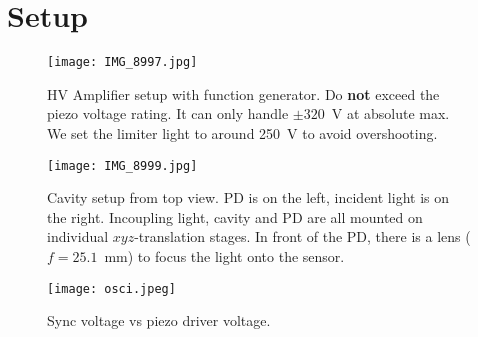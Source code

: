 \section{Setup}
\begin{figure}[htbp]
    \centering
    \texttt{[image: IMG\_8997.jpg]}
    \caption{HV Amplifier setup with function generator. Do \textbf{not} exceed the piezo voltage rating. It can only handle $\pm 320$~V at absolute max. We set the limiter light to around 250~V to avoid overshooting.}
\end{figure}

\begin{figure}[htbp]
    \centering
    \texttt{[image: IMG\_8999.jpg]}
    \caption{Cavity setup from top view. PD is on the left, incident light is on the right. Incoupling light, cavity and PD are all mounted on individual $xyz$-translation stages. In front of the PD, there is a lens ($f=25.1$~mm) to focus the light onto the sensor.}
    \label{fig:setup}
\end{figure}

\begin{figure}[htbp]
    \centering
    \texttt{[image: osci.jpeg]}
    \caption{Sync voltage vs piezo driver voltage.}
    \label{fig:osci}
\end{figure}
